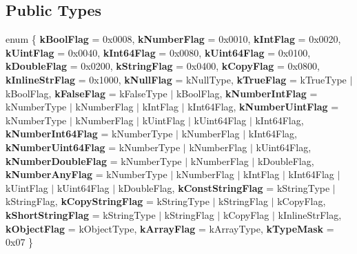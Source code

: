 \subsection*{Public Types}
\begin{DoxyCompactItemize}
\item 
\mbox{\label{class_generic_value_aacdfd9d0f85a6161380a134e6d0c9d3c}} 
enum \{ \newline
{\bfseries k\+Bool\+Flag} = 0x0008, 
{\bfseries k\+Number\+Flag} = 0x0010, 
{\bfseries k\+Int\+Flag} = 0x0020, 
{\bfseries k\+Uint\+Flag} = 0x0040, 
\newline
{\bfseries k\+Int64\+Flag} = 0x0080, 
{\bfseries k\+Uint64\+Flag} = 0x0100, 
{\bfseries k\+Double\+Flag} = 0x0200, 
{\bfseries k\+String\+Flag} = 0x0400, 
\newline
{\bfseries k\+Copy\+Flag} = 0x0800, 
{\bfseries k\+Inline\+Str\+Flag} = 0x1000, 
{\bfseries k\+Null\+Flag} = k\+Null\+Type, 
{\bfseries k\+True\+Flag} = k\+True\+Type $\vert$ k\+Bool\+Flag, 
\newline
{\bfseries k\+False\+Flag} = k\+False\+Type $\vert$ k\+Bool\+Flag, 
{\bfseries k\+Number\+Int\+Flag} = k\+Number\+Type $\vert$ k\+Number\+Flag $\vert$ k\+Int\+Flag $\vert$ k\+Int64\+Flag, 
{\bfseries k\+Number\+Uint\+Flag} = k\+Number\+Type $\vert$ k\+Number\+Flag $\vert$ k\+Uint\+Flag $\vert$ k\+Uint64\+Flag $\vert$ k\+Int64\+Flag, 
{\bfseries k\+Number\+Int64\+Flag} = k\+Number\+Type $\vert$ k\+Number\+Flag $\vert$ k\+Int64\+Flag, 
\newline
{\bfseries k\+Number\+Uint64\+Flag} = k\+Number\+Type $\vert$ k\+Number\+Flag $\vert$ k\+Uint64\+Flag, 
{\bfseries k\+Number\+Double\+Flag} = k\+Number\+Type $\vert$ k\+Number\+Flag $\vert$ k\+Double\+Flag, 
{\bfseries k\+Number\+Any\+Flag} = k\+Number\+Type $\vert$ k\+Number\+Flag $\vert$ k\+Int\+Flag $\vert$ k\+Int64\+Flag $\vert$ k\+Uint\+Flag $\vert$ k\+Uint64\+Flag $\vert$ k\+Double\+Flag, 
{\bfseries k\+Const\+String\+Flag} = k\+String\+Type $\vert$ k\+String\+Flag, 
\newline
{\bfseries k\+Copy\+String\+Flag} = k\+String\+Type $\vert$ k\+String\+Flag $\vert$ k\+Copy\+Flag, 
{\bfseries k\+Short\+String\+Flag} = k\+String\+Type $\vert$ k\+String\+Flag $\vert$ k\+Copy\+Flag $\vert$ k\+Inline\+Str\+Flag, 
{\bfseries k\+Object\+Flag} = k\+Object\+Type, 
{\bfseries k\+Array\+Flag} = k\+Array\+Type, 
\newline
{\bfseries k\+Type\+Mask} = 0x07
 \}
\item 

\end{DoxyCompactItemize}

